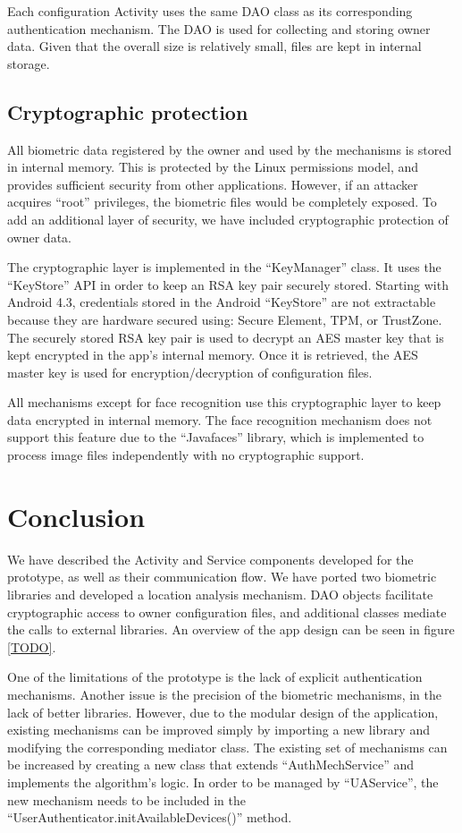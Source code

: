 Each configuration Activity uses the same DAO class as its corresponding authentication mechanism. The DAO is used for collecting and storing owner data. Given that the overall size is relatively small, files are kept in internal storage.

\subsection{Cryptographic protection}
All biometric data registered by the owner and used by the mechanisms is stored in internal memory. This is protected by the Linux permissions model, and provides sufficient security from other applications. However, if an attacker acquires ``root'' privileges, the biometric files would be completely exposed. To add an additional layer of security, we have included cryptographic protection of owner data.

The cryptographic layer is implemented in the ``KeyManager'' class. It uses the ``KeyStore'' API in order to keep an RSA key pair securely stored. Starting with Android 4.3, credentials stored in the Android ``KeyStore'' are not extractable because they are hardware secured using: Secure Element, TPM, or TrustZone. The securely stored RSA key pair is used to decrypt an AES master key that is kept encrypted in the app's internal memory. Once it is retrieved, the AES master key is used for encryption/decryption of configuration files.

All mechanisms except for face recognition use this cryptographic layer to keep data encrypted in internal memory. The face recognition mechanism does not support this feature due to the ``Javafaces'' library, which is implemented to process image files independently with no cryptographic support. 

\section{Conclusion}
We have described the Activity and Service components developed for the prototype, as well as their communication flow. We have ported two biometric libraries and developed a location analysis mechanism. DAO objects facilitate cryptographic access to owner configuration files, and additional classes mediate the calls to external libraries. An overview of the app design can be seen in figure \ref{TODO}.

One of the limitations of the prototype is the lack of explicit authentication mechanisms. Another issue is the precision of the biometric mechanisms, in the lack of better libraries. However, due to the modular design of the application, existing mechanisms can be improved simply by importing a new library and modifying the corresponding mediator class. The existing set of mechanisms can be increased by creating a new class that extends ``AuthMechService'' and implements the algorithm's logic. In order to be managed by ``UAService'', the new mechanism needs to be included in the ``UserAuthenticator.initAvailableDevices()'' method.

